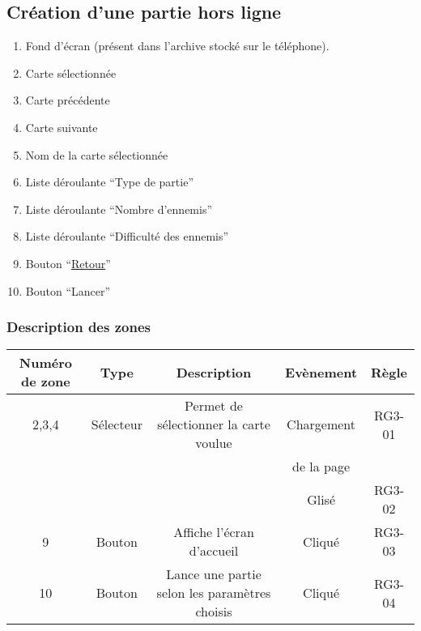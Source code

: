 \documentclass{report}
\begin{document}
		$\,$
	
\newpage

	\subsection{Création d'une partie hors ligne}
	
		\hypertarget{Creer partie solo}{}
		\label{Creer partie solo}

		\begin{center}
					
		\end{center}
		
		\begin{enumerate}
		  \item Fond d'écran (présent dans l'archive stocké sur le téléphone).
		  \item Carte sélectionnée
		  \item Carte précédente
		  \item Carte suivante
		  \item Nom de la carte sélectionnée
		  \item Liste déroulante ``Type de partie''
		  \item Liste déroulante ``Nombre d'ennemis''
		  \item Liste déroulante ``Difficulté des ennemis''
		  \item Bouton ``\hyperlink{Accueil}{Retour}''
		  \item Bouton ``Lancer'' 
		\end{enumerate}
		
		\subsubsection{Description des zones}
		
			\begin{tabular}{|c|c|c|c|c|} \hline
				Numéro de zone & Type  & Description & Evènement &	Règle \\\hline
				2,3,4 & Sélecteur & Permet de sélectionner la carte voulue & Chargement & RG3-01 \\
				      &           &                                        & de la page & \\
				      &           &                                        & Glisé    & RG3-02 \\\hline
				9 & Bouton & Affiche l'écran d'accueil & Cliqué & RG3-03 \\\hline
				10& Bouton & Lance une partie selon les paramètres choisis & Cliqué & RG3-04 \\\hline
			\end{tabular}
\end{document}
